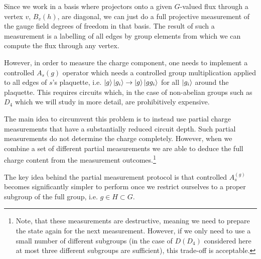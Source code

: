 \documentclass[a4paper,twocolumn,11pt, accepted=2024-06-14]{quantumarticle}
\begin{document}
Since we work in a basis where projectors onto a given $G$-valued flux through a vertex $v$, $B_v{(h)}$, are diagonal, we can just do a full projective measurement of the gauge field degrees of freedom in that basis. 
The result of such a measurement is a labelling of all edges by group elements from which we can compute the flux through any vertex. 

However, in order to measure the charge component, one needs to implement a controlled $A_s{(g)}$ operator which needs a controlled group multiplication applied to all edges of $s$'s plaquette, i.e. $\ket{g}\ket{g_i} \rightarrow \ket{g}\ket{gg_i}$ for all $\ket{g_i}$ around the plaquette.
This requires circuits which, in the case of non-abelian groups such as $D_4$ which we will study in more detail, are prohibitively expensive. 

The main idea to circumvent this problem is to instead use partial charge measurements that have a substantially reduced circuit depth. Such partial measurements do not determine the charge completely. However, when we combine a set of different partial measurements we are able to deduce the full charge content from the measurement outcomes.\footnote{Note, that these measurements are destructive, meaning we need to prepare the state again for the next measurement. However, if we only need to use a small number of different subgroups (in the case of $D(D_4)$ considered here at most three different subgroups are sufficient), this trade-off is acceptable.}

The key idea behind the partial measurement protocol is that controlled $A_s^{(g)}$ becomes significantly simpler to perform once we restrict ourselves to a proper subgroup of the full group, i.e. $g \in H \subset G$.
\end{document}
